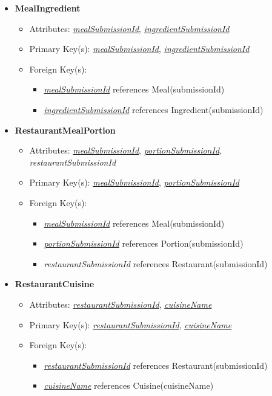 \documentclass{article}
\begin{document}
\begin{itemize}
        \item \textbf{MealIngredient}
        \begin{itemize}
            \item Attributes: \underline{\textit{mealSubmissionId}}, \underline{\textit{ingredientSubmissionId}}
            \item Primary Key(s): \underline{\textit{mealSubmissionId}}, \underline{\textit{ingredientSubmissionId}}
            \item Foreign Key(s): 
                \begin{itemize}
                    \item \underline{\textit{mealSubmissionId}} references Meal(submissionId)
                    \item \underline{\textit{ingredientSubmissionId}} references Ingredient(submissionId)
                \end{itemize}   
        \end{itemize}

        \item \textbf{RestaurantMealPortion}
        \begin{itemize}
            \item Attributes: \underline{\textit{mealSubmissionId}}, \underline{\textit{portionSubmissionId}}, \textit{restaurantSubmissionId}
            \item Primary Key(s): \underline{\textit{mealSubmissionId}}, \underline{\textit{portionSubmissionId}}
            \item Foreign Key(s):
            \begin{itemize}
                \item \underline{\textit{mealSubmissionId}} references Meal(submissionId)
                \item \underline{\textit{portionSubmissionId}} references Portion(submissionId)
                \item \textit{restaurantSubmissionId} references Restaurant(submissionId)
            \end{itemize}            
        \end{itemize}

        \item \textbf{RestaurantCuisine}
        \begin{itemize}
            \item Attributes: \underline{\textit{restaurantSubmissionId}}, \underline{\textit{cuisineName}}
            \item Primary Key(s): \underline{\textit{restaurantSubmissionId}}, \underline{\textit{cuisineName}}
            \item Foreign Key(s): 
                \begin{itemize}
                    \item \underline{\textit{restaurantSubmissionId}} references Restaurant(submissionId)
                    \item \underline{\textit{cuisineName}} references Cuisine(cuisineName)
                \end{itemize}   
        \end{itemize}


\end{itemize}
\end{document}
